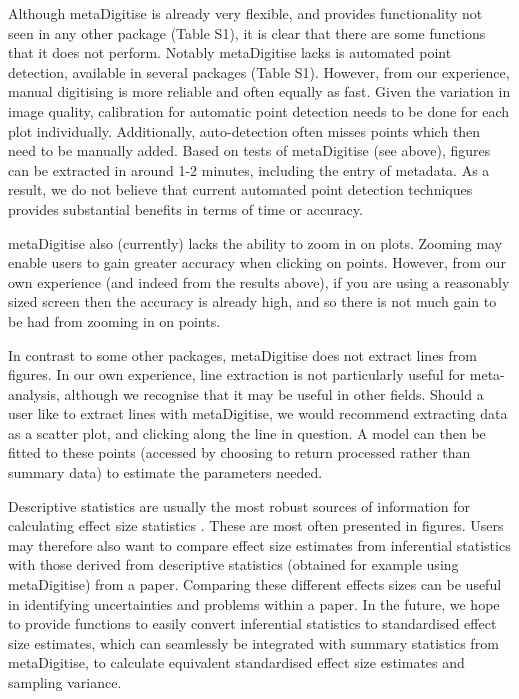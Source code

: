 \documentclass[12pt]{article}
\newcommand{\pkg}[1]{{\fontseries{b}\selectfont #1}}
\begin{document}
Although \pkg{metaDigitise} is already very flexible, and provides functionality not seen in any other package (Table S1), it is clear that there are some functions that it does not perform. Notably \pkg{metaDigitise} lacks is automated point detection, available in several packages (Table S1). However, from our experience, manual digitising is more reliable and often equally as fast. Given the variation in image quality, calibration for automatic point detection needs to be done for each plot individually. Additionally, auto-detection often misses points which then need to be manually added. Based on tests of \pkg{metaDigitise} (see above), figures can be extracted in around 1-2 minutes, including the entry of metadata. As a result, we do not believe that current automated point detection techniques provides substantial benefits in terms of time or accuracy.

\pkg{metaDigitise} also (currently) lacks the ability to zoom in on plots. Zooming may enable users to gain greater accuracy when clicking on points. However, from our own experience (and indeed from the results above), if you are using a reasonably sized screen then the accuracy is already high, and so there is not much gain to be had from zooming in on points.

In contrast to some other packages, \pkg{metaDigitise} does not extract lines from figures. In our own experience, line extraction is not particularly useful for meta-analysis, although we recognise that it may be useful in other fields. Should a user like to extract lines with \pkg{metaDigitise}, we would recommend extracting data as a scatter plot, and clicking along the line in question. A model can then be fitted to these points (accessed by choosing to return processed rather than summary data) to estimate the parameters needed.


Descriptive statistics are usually the most robust sources of information for calculating effect size statistics \citep{Noble2017}. These are most often presented in figures. Users may therefore also want to compare effect size estimates from inferential statistics with those derived from descriptive statistics (obtained for example using \pkg{metaDigitise}) from a paper. Comparing these different effects sizes can be useful in identifying uncertainties and problems within a paper. In the future, we hope to provide functions to easily convert inferential statistics to standardised effect size estimates, which can seamlessly be integrated with summary statistics from \pkg{metaDigitise}, to calculate equivalent standardised effect size estimates and sampling variance.
\end{document}
